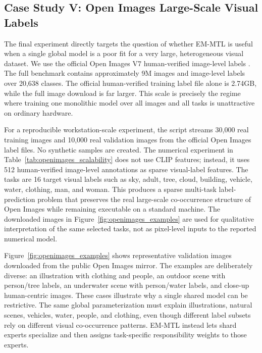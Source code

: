 \documentclass[preprint,12pt]{elsarticle}
\begin{document}
	\subsection{Case Study V: Open Images Large-Scale Visual Labels}

	The final experiment directly targets the question of whether EM-MTL is
	useful when a single global model is a poor fit for a very large,
	heterogeneous visual dataset. We use the official Open Images V7
	human-verified image-level labels \citep{kuznetsova2020openimages}.
	The full benchmark contains approximately 9M images and image-level
	labels over 20,638 classes. The official human-verified training label
	file alone is 2.74GB, while the full image download is far larger. This
	scale is precisely the regime where training one monolithic model over
	all images and all tasks is unattractive on ordinary hardware.

	For a reproducible workstation-scale experiment, the script streams
	30,000 real training images and 10,000 real validation images from the
	official Open Images label files. No synthetic samples are created. The
	numerical experiment in Table~\ref{tab:openimages_scalability} does not
	use CLIP features; instead, it uses 512 human-verified image-level
	annotations as sparse visual-label features. The tasks are 16 target
	visual labels such as sky, adult, tree, cloud, building, vehicle, water,
	clothing, man, and woman. This produces a sparse multi-task
	label-prediction problem that preserves the real large-scale
	co-occurrence structure of Open Images while remaining executable on a
	standard machine. The downloaded images in Figure~\ref{fig:openimages_examples}
	are used for qualitative interpretation of the same selected tasks, not
	as pixel-level inputs to the reported numerical model.

	Figure~\ref{fig:openimages_examples} shows representative validation
	images downloaded from the public Open Images mirror. The examples are
	deliberately diverse: an illustration with clothing and people, an
	outdoor scene with person/tree labels, an underwater scene with
	person/water labels, and close-up human-centric images. These cases
	illustrate why a single shared model can be restrictive. The same global
	parameterization must explain illustrations, natural scenes, vehicles,
	water, people, and clothing, even though different label subsets rely on
	different visual co-occurrence patterns. EM-MTL instead lets shard
	experts specialize and then assigns task-specific responsibility weights
	to those experts.
\end{document}
